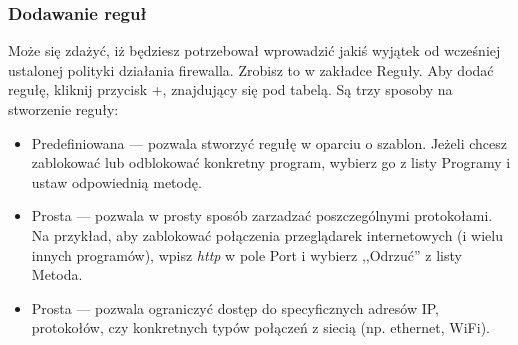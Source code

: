 \subsubsection{Dodawanie reguł}
Może się zdażyć, iż będziesz potrzebował wprowadzić jakiś wyjątek od wcześniej ustalonej polityki działania firewalla. Zrobisz to w zakładce \textcolor{ubuntu_orange}{Reguły}. Aby dodać regułę, kliknij przycisk +, znajdujący się pod tabelą. Są trzy sposoby na stworzenie reguły:

\begin{itemize}
\item \textcolor{ubuntu_orange}{Predefiniowana} --- pozwala stworzyć regułę w oparciu o szablon. Jeżeli chcesz zablokować lub odblokować konkretny program, wybierz go z listy \textcolor{ubuntu_orange}{Programy} i ustaw odpowiednią metodę.
\item \textcolor{ubuntu_orange}{Prosta} --- pozwala w prosty sposób zarzadzać poszczególnymi protokołami. Na przykład, aby zablokować połączenia przeglądarek internetowych (i wielu innych programów), wpisz \textit{http} w pole \textcolor{ubuntu_orange}{Port} i wybierz ,,Odrzuć'' z listy \textcolor{ubuntu_orange}{Metoda}.
\item \textcolor{ubuntu_orange}{Prosta} --- pozwala ograniczyć dostęp do specyficznych adresów IP, protokołów, czy konkretnych typów połączeń z siecią (np. ethernet, WiFi).
\end{itemize}
